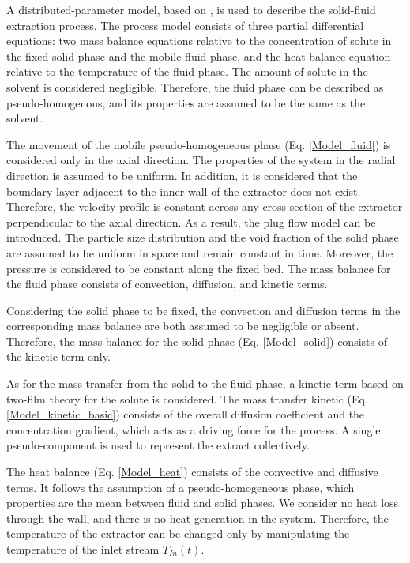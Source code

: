 \documentclass[a4paper,fleqn]{cas-dc}
\begin{document}
{\color{blue}A distributed-parameter model, based on \citet{Reverchon1996}, is used to describe the solid-fluid extraction process. The process model consists of three partial differential equations: two mass balance equations relative to the concentration of solute in the fixed solid phase and the mobile fluid phase, and the heat balance equation relative to the temperature of the fluid phase. The amount of solute in the solvent is considered negligible. Therefore, the fluid phase can be described as pseudo-homogenous, and its properties are assumed to be the same as the solvent.
	
The movement of the mobile pseudo-homogeneous phase (Eq. \ref{Model_fluid}) is considered only in the axial direction. The properties of the system in the radial direction is assumed to be uniform. In addition, it is considered that the boundary layer adjacent to the inner wall of the extractor does not exist. Therefore, the velocity profile is constant across any cross-section of the extractor perpendicular to the axial direction. As a result, the plug flow model can be introduced. The particle size distribution and the void fraction of the solid phase are assumed to be uniform in space and remain constant in time. Moreover, the pressure is considered to be constant along the fixed bed. The mass balance for the fluid phase consists of convection, diffusion, and kinetic terms.
	
Considering the solid phase to be fixed, the convection and diffusion terms in the corresponding mass balance are both assumed to be negligible or absent. Therefore, the mass balance for the solid phase (Eq. \ref{Model_solid}) consists of the kinetic term only. 
	
As for the mass transfer from the solid to the fluid phase, a kinetic term based on two-film theory for the solute is considered. The mass transfer kinetic (Eq. \ref{Model_kinetic_basic}) consists of the overall diffusion coefficient and the concentration gradient, which acts as a driving force for the process. A single pseudo-component is used to represent the extract collectively.
	
The heat balance (Eq. \ref{Model_heat}) consists of the convective and diffusive terms. It follows the assumption of a pseudo-homogeneous phase, which properties are the mean between fluid and solid phases. We consider no heat loss through the wall, and there is no heat generation in the system. Therefore, the temperature of the extractor can be changed only by manipulating the temperature of the inlet stream $T_{In}(t)$.
}
\end{document}
